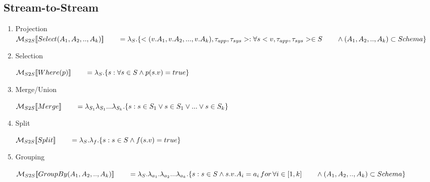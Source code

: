 

\subsection*{Stream-to-Stream}
\begin{enumerate}
	\item Projection	
	$\mathcal{M}_{S2S}[\![Select(A_1,A_2,..,A_k)]\!] \\
		{}\qquad= \lambda_S.\{<(v.A_1,v.A_2,...,v.A_k),\tau_{app},\tau_{sys}>: \forall s<v,\tau_{app},\tau_{sys}>\in S \\
		{}\qquad\land (A_1,A_2,..,A_k) \subset Schema \}$ 
		
	\item Selection
	
	$\mathcal{M}_{S2S}[\![Where(p)]\!] \\
		{}\qquad= \lambda_S.\{s: \forall s \in S  \land p(s.v) = true \}$ 
		
	\item Merge/Union
	
	$\mathcal{M}_{S2S}[\![Merge]\!] \\
		{}\qquad= \lambda_{S_1}\lambda_{S_1}...\lambda_{S_k}.\{s: s \in S_1 \lor s \in S_1 \lor ... \lor s \in S_k \}$ 
	
	\item Split
	
	$\mathcal{M}_{S2S}[\![Split]\!] \\
		{}\qquad= \lambda_{S}.\lambda_{f}.\{s: s \in S \land f(s.v) = true \}$ 
	\item Grouping
	
	$\mathcal{M}_{S2S}[\![GroupBy(A_1,A_2,..,A_k)]\!] \\
		{}\qquad= \lambda_S.\lambda_{a_1}.\lambda_{a_2}...\lambda_{a_k}.\{s: s \in S  \land  s.v.A_i= a_i \,for\, \forall i \in [1,k]\\
		{}\qquad\land (A_1,A_2,..,A_k) \subset Schema \}$ 
\end{enumerate}

